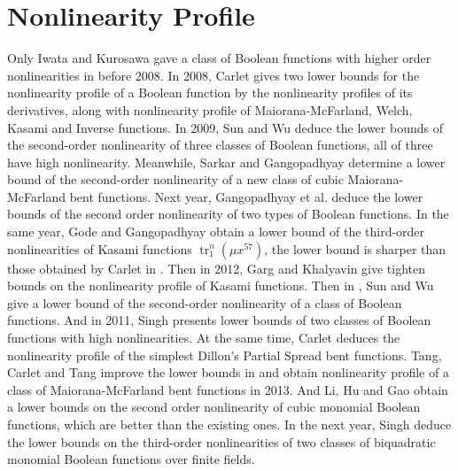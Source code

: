 \documentclass[8pt,oneside]{article}
\newcommand{\0}{\textbf{0}}
\newcommand{\1}{\textbf{1}}
\begin{document}
\section{Nonlinearity Profile}
    Only Iwata and Kurosawa gave a class of Boolean functions with higher order nonlinearities in \cite{IwataK1999highorderbentfunction} before 2008. 
    In 2008, Carlet\cite{Carlet2008lowbound_NL_profile} gives two lower bounds for the nonlinearity profile of a Boolean function 
    by the nonlinearity profiles of its derivatives, along with nonlinearity profile of Maiorana-McFarland, Welch, Kasami and Inverse functions.
    In 2009, Sun and Wu deduce the lower bounds of the second-order nonlinearity of three classes of Boolean functions, 
    all of three have high nonlinearity\cite{SunW2009NL_2}. 
    Meanwhile, Sarkar and Gangopadhyay determine a lower bound 
    of the second-order nonlinearity of a new class of cubic Maiorana-McFarland bent functions\cite{SarkarG2009NL_2MM}. 
    Next year, Gangopadhyay et al. deduce the lower bounds of the second order nonlinearity of two types of Boolean functions\cite{GangopadhyayST2010NL_2}. 
    In the same year, Gode and Gangopadhyay obtain a lower bound of the third-order nonlinearities of 
    Kasami functions $ \operatorname{tr}_1^n(\mu x^{57}) $\cite{GodeG2010NL_3Kasami}, the lower bound is sharper than 
    those obtained by Carlet in \cite{Carlet2008lowbound_NL_profile}. Then in 2012, Garg and Khalyavin give tighten 
    bounds on the nonlinearity profile of Kasami functions\cite{GargK2012NLr_Kasami}. 
    Then in \cite{SunW2011NL_2}, Sun and Wu give a lower bound of the second-order nonlinearity of a class of Boolean functions. 
    And in 2011, Singh presents lower bounds of two classes of Boolean functions with high nonlinearities\cite{Singh2011NL_2}. 
    At the same time, Carlet\cite{Carlet2011NL_Profile_Dillon} deduces the nonlinearity profile of the simplest 
    Dillon's Partial Spread bent functions. 
    Tang, Carlet and Tang\cite{TangCT2013NL_2bent} improve the lower bounds in \cite{Carlet2011NL_Profile_Dillon} 
    and obtain nonlinearity profile of a class of Maiorana-McFarland bent functions in 2013. 
    And Li, Hu and Gao obtain a lower bounds on the second order nonlinearity of cubic monomial Boolean functions\cite{LiHG11BNL_2}, which are better than the existing ones\cite{GodeG2009NL_2_cubicmonomial}.
    In the next year, Singh deduce the lower bounds on the third-order nonlinearities of two classes of 
    biquadratic monomial Boolean functions over finite fields\cite{Singh2014NL_3_biquadratic}. 
\end{document}
